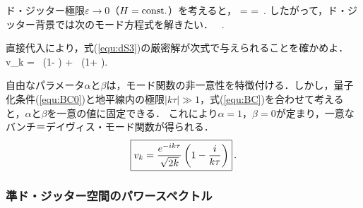 ド・ジッター極限$\varepsilon \to 0$（$H = {\rm const.}$）を考えると，
\beq
{} =  =\, .
\eeq
したがって，ド・ジッター背景では次のモード方程式を解きたい．
\beq
\label{equ:dS3}
\, .
\eeq

\begin{thm}[ド・ジッター空間のモード関数]
直接代入により，式(\ref{equ:dS3})の厳密解が次式で与えられることを確かめよ．
\beq
v_k = \alpha \,  \left(1-  \right) + \beta\,  \left(1+  \right).
\eeq
\end{thm}

自由なパラメータ$\alpha$と$\beta$は，モード関数の非一意性を特徴付ける．しかし，量子化条件(\ref{equ:BC0})と地平線内の極限$| k \tau| \gg 1$，式(\ref{equ:BC})を合わせて考えると，$\alpha$と$\beta$を一意の値に固定できる．
これにより$\alpha=1$，$\beta=0$が定まり，一意なバンチ＝デイヴィス・モード関数が得られる．
\begin{equation}
\fbox{$\displaystyle
v_{k} = \frac{e^{-i k \tau}}{\sqrt{2k}} \left(1-\frac{i}{k \tau} \right) $}\, .
\end{equation}




\subsubsection{準ド・ジッター空間のパワースペクトル}

